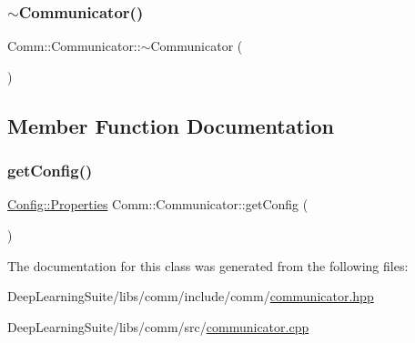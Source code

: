 \subsubsection{\texorpdfstring{$\sim$\+Communicator()}{~Communicator()}}
{\footnotesize\ttfamily Comm\+::\+Communicator\+::$\sim$\+Communicator (\begin{DoxyParamCaption}{ }\end{DoxyParamCaption})}



\subsection{Member Function Documentation}
\mbox{\label{class_comm_1_1_communicator_ab03173df851ed3eb0f84f83f1ecd455f}} 
\subsubsection{\texorpdfstring{get\+Config()}{getConfig()}}
{\footnotesize\ttfamily \hyperlink{class_config_1_1_properties}{Config\+::\+Properties} Comm\+::\+Communicator\+::get\+Config (\begin{DoxyParamCaption}{ }\end{DoxyParamCaption})}



The documentation for this class was generated from the following files\+:\begin{DoxyCompactItemize}
\item 
Deep\+Learning\+Suite/libs/comm/include/comm/\hyperlink{communicator_8hpp}{communicator.\+hpp}\item 
Deep\+Learning\+Suite/libs/comm/src/\hyperlink{communicator_8cpp}{communicator.\+cpp}\end{DoxyCompactItemize}
